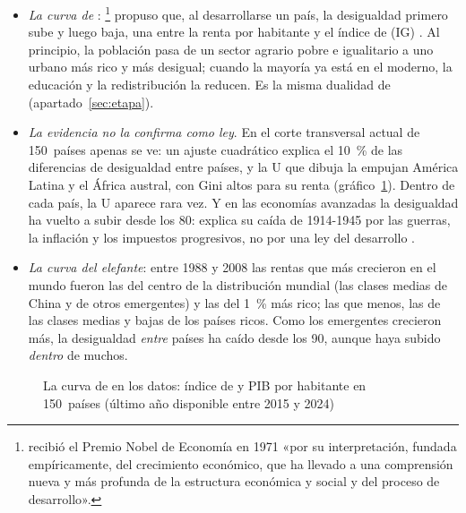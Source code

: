 \documentclass[11pt]{article}
\begin{document}
\begin{itemize}

  \item \emph{La curva de }: \textcite{Kuznets1955}\footnote{ recibió el Premio Nobel de Economía en 1971 «por su interpretación, fundada empíricamente, del crecimiento económico, que ha llevado a una comprensión nueva y más profunda de la estructura económica y social y del proceso de desarrollo»\nocite{Nobel1971Kuznets}.} propuso que, al desarrollarse un país, la desigualdad primero sube y luego baja, una  entre la renta por habitante y el índice de  (IG) . Al principio, la población pasa de un sector agrario pobre e igualitario a uno urbano más rico y más desigual; cuando la mayoría ya está en el moderno, la educación y la redistribución la reducen. Es la misma dualidad de  (apartado~\ref{sec:etapa}).
  \item \emph{La evidencia no la confirma como ley}. En el corte transversal actual de 150~países apenas se ve: un ajuste cuadrático explica el 10~\% de las diferencias de desigualdad entre países, y la U que dibuja la empujan América Latina y el África austral, con Gini altos para su renta (gráfico~\ref{fig:kuznets}). Dentro de cada país, la U aparece rara vez\nocite{DeiningerSquire1998}. Y en las economías avanzadas la desigualdad ha vuelto a subir desde los 80: \textcite{Piketty2014} explica su caída de 1914-1945 por las guerras, la inflación y los impuestos progresivos, no por una ley del desarrollo .
  \item \emph{La curva del elefante}: entre 1988 y 2008 las rentas que más crecieron en el mundo fueron las del centro de la distribución mundial (las clases medias de China y de otros emergentes) y las del 1~\% más rico; las que menos, las de las clases medias y bajas de los países ricos\nocite{LaknerMilanovic2016}. Como los emergentes crecieron más, la desigualdad \emph{entre} países ha caído desde los 90, aunque haya subido \emph{dentro} de muchos\nocite{Milanovic2016}.
\end{itemize}

\begin{figure}[H]
\centering
\caption{La curva de  en los datos: índice de  y PIB por habitante en 150~países (último año disponible entre 2015 y 2024)}\label{fig:kuznets}
\end{figure}
\end{document}
